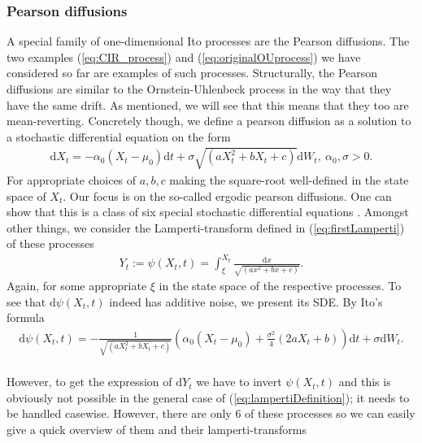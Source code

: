 \subsubsection{Pearson diffusions}
A special family of one-dimensional Ito processes are the Pearson diffusions. The two examples (\ref{eq:CIR_process}) and (\ref{eq:originalOUprocess}) we have considered so far are examples of such processes. Structurally, the Pearson diffusions are similar to the Ornstein-Uhlenbeck process in the way that they have the same drift. As mentioned, we will see that this means that they too are mean-reverting. Concretely though, we define a pearson diffusion as a solution to a stochastic differential equation on the form
\begin{align}
    \mathrm{d}X_t = -\alpha_0 \left(X_t - \mu_0\right)\mathrm{d}t + \sigma\sqrt{\left(aX_t^2 + bX_t + c\right)}\mathrm{d}W_t, \: \alpha_0, \sigma > 0. \label{eq:pearsonDiffusion}
\end{align}
For appropriate choices of $a, b, c$ making the square-root well-defined in the state space of $X_t$. Our focus is on the so-called ergodic pearson diffusions. One can show that this is a class of six special stochastic differential equations \cite[p.36]{StatisticalMethodsForSDE}. Amongst other things, we consider the Lamperti-transform defined in (\ref{eq:firstLamperti}) of these processes
\begin{align}
    Y_t := \psi\left(X_t, t\right) = \int_{\xi}^{X_t} \frac{\mathrm{d}x}{\sqrt{\left(ax^2 + bx + c\right)}}. \label{eq:lampertiDefinition}
\end{align}
Again, for some appropriate $\xi$ in the state space of the respective processes. To see that $\mathrm{d}\psi\left(X_t, t\right)$ indeed has additive noise, we present its SDE. By Ito's formula
\begin{align}
    \mathrm{d}\psi\left(X_t, t\right) = - \frac{1}{\sqrt{\left(aX_t^2 + bX_t + c\right)}}\left(\alpha_0\left(X_t - \mu_0\right) + \frac{\sigma^2}{4}\left(2aX_t + b\right)\right)\mathrm{d}t + \sigma \mathrm{d}W_t.
\end{align}\\
However, to get the expression of $\mathrm{d}Y_t$ we have to invert $\psi\left(X_t, t\right)$ and this is obviously not possible in the general case of (\ref{eq:lampertiDefinition}); it needs to be handled casewise. However, there are only 6 of these processes so we can easily give a quick overview of them \cite[p.36]{StatisticalMethodsForSDE} and their lamperti-transforms
